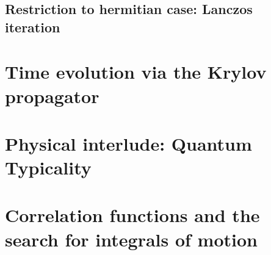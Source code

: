\subsection{Restriction to hermitian case: Lanczos iteration}



\section{Time evolution via the Krylov propagator}

\section{Physical interlude: Quantum Typicality}

\section{Correlation functions and the search for integrals of motion}


